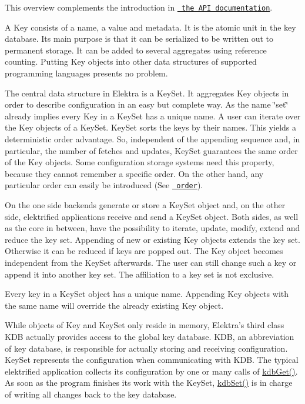 This overview complements the introduction in \href{https://doc.libelektra.org/api/current/html/}{\texttt{ the A\+PI documentation}}.

A {\ttfamily Key} consists of a name, a value and metadata. It is the atomic unit in the key database. Its main purpose is that it can be serialized to be written out to permanent storage. It can be added to several aggregates using reference counting. Putting {\ttfamily Key} objects into other data structures of supported programming languages presents no problem.

The central data structure in Elektra is a {\ttfamily Key\+Set}. It aggregates {\ttfamily Key} objects in order to describe configuration in an easy but complete way. As the name \char`\"{}set\char`\"{} already implies every {\ttfamily Key} in a {\ttfamily Key\+Set} has a unique name. A user can iterate over the {\ttfamily Key} objects of a {\ttfamily Key\+Set}. {\ttfamily Key\+Set} sorts the keys by their names. This yields a deterministic order advantage. So, independent of the appending sequence and, in particular, the number of fetches and updates, {\ttfamily Key\+Set} guarantees the same order of the {\ttfamily Key} objects. Some configuration storage systems need this property, because they cannot remember a specific order. On the other hand, any particular order can easily be introduced (See \href{/home/mpranj/workspace/libelektra/doc/METADATA.ini}{\texttt{ order}}).

On the one side backends generate or store a {\ttfamily Key\+Set} object and, on the other side, elektrified applications receive and send a {\ttfamily Key\+Set} object. Both sides, as well as the core in between, have the possibility to iterate, update, modify, extend and reduce the key set. Appending of new or existing {\ttfamily Key} objects extends the key set. Otherwise it can be reduced if keys are popped out. The {\ttfamily Key} object becomes independent from the {\ttfamily Key\+Set} afterwards. The user can still change such a key or append it into another key set. The affiliation to a key set is not exclusive.

Every key in a {\ttfamily Key\+Set} object has a unique name. Appending {\ttfamily Key} objects with the same name will override the already existing {\ttfamily Key} object.

While objects of {\ttfamily Key} and {\ttfamily Key\+Set} only reside in memory, Elektra’s third class {\ttfamily K\+DB} actually provides access to the global key database. {\ttfamily K\+DB}, an abbreviation of key database, is responsible for actually storing and receiving configuration. {\ttfamily Key\+Set} represents the configuration when communicating with {\ttfamily K\+DB}. The typical elektrified application collects its configuration by one or many calls of {\ttfamily \mbox{\hyperlink{group__kdb_ga28e385fd9cb7ccfe0b2f1ed2f62453a1}{kdb\+Get()}}}. As soon as the program finishes its work with the {\ttfamily Key\+Set}, {\ttfamily \mbox{\hyperlink{group__kdb_ga11436b058408f83d303ca5e996832bcf}{kdb\+Set()}}} is in charge of writing all changes back to the key database.

